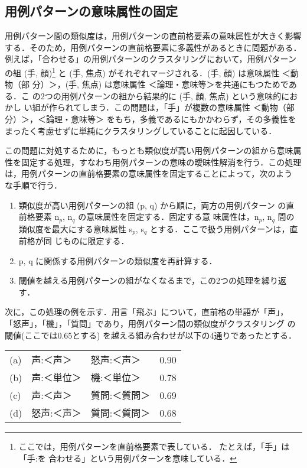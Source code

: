 \vspace{1em}
\subsection{用例パターンの意味属性の固定}
\label{用例パターンの意味属性の固定}

用例パターン間の類似度は，用例パターンの直前格要素の意味属性が大きく影響
する．そのため，用例パターンの直前格要素に多義性があるときに問題がある．
例えば，「合わせる」の用例パターンのクラスタリングにおいて，用例パターン
の組 (手, 顔)\footnote{ここでは，用例パターンを直前格要素で表している．
たとえば，「手」は「手:を 合わせる」という用例パターンを意味している．}
と (手, 焦点) がそれぞれマージされる．(手, 顔) は意味属性 ＜動物（部
分）＞，(手, 焦点) は意味属性 ＜論理・意味等＞を共通にもつためである．こ
の2つの用例パターンの組から結果的に (手, 顔, 焦点) という意味的におかし
い組が作られてしまう．この問題は，「手」が複数の意味属性 ＜動物（部
分）＞，＜論理・意味等＞ をもち，多義であるにもかかわらず，その多義性を
まったく考慮せずに単純にクラスタリングしていることに起因している．

この問題に対処するために，もっとも類似度が高い用例パターンの組から意味属
性を固定する処理，すなわち用例パターンの意味の曖昧性解消を行う．この処理
は，用例パターンの直前格要素の意味属性を固定することによって，次のよう
な手順で行う．

\begin{enumerate}
 \item 類似度が高い用例パターンの組 (p, q) から順に，両方の用例パターン
       の直前格要素 n${}_p$, n${}_q$ の意味属性を固定する．固定する意
       味属性は，n${}_p$, n${}_q$ 間の類似度を最大にする意味属性 
       s${}_p$, s${}_q$ とする．ここで扱う用例パターンは，直前格が同
       じものに限定する．
 \item p, q に関係する用例パターンの類似度を再計算する．
 \item 閾値を越える用例パターンの組がなくなるまで，この2つの処理を繰り返
       す．
\end{enumerate}

次に，この処理の例を示す．用言「飛ぶ」について，直前格の単語が「声」，
「怒声」，「機」，「質問」であり，用例パターン間の類似度がクラスタリング
の閾値(ここでは0.65とする) を越える組み合わせが以下の4通りであったとする．

\vspace*{1ex}

\begin{tabular}{lllr}
(a) & 声:＜声＞ & 怒声:＜声＞ & 0.90 \\
(b) & 声:＜単位＞ & 機:＜単位＞ & 0.78 \\
(c) & 声:＜声＞ & 質問:＜質問＞ & 0.69 \\
(d) & 怒声:＜声＞ & 質問:＜質問＞ & 0.68
\end{tabular}


